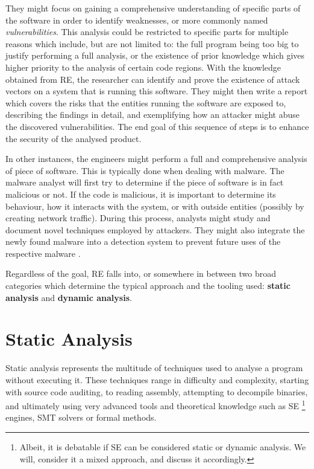 They might focus on gaining a comprehensive understanding of specific parts of the software in order to identify weaknesses, or more commonly named \emph{vulnerabilities}. This analysis could be restricted to specific parts for multiple reasons which include, but are not limited to: the full program being too big to justify performing a full analysis, or the existence of prior knowledge which gives higher priority to the analysis of certain code regions. With the knowledge obtained from \gls{RE}, the researcher can identify and prove the existence of attack vectors on a system that is running this software. They might then write a report which covers the risks that the entities running the software are exposed to, describing the findings in detail, and exemplifying how an attacker might abuse the discovered vulnerabilities. The end goal of this sequence of steps is to enhance the security of the analysed product.

In other instances, the engineers might perform a full and comprehensive analysis of piece of software. This is typically done when dealing with malware. The malware analyst will first try to determine if the piece of software is in fact malicious or not. If the code is malicious, it is important to determine its behaviour, how it interacts with the system, or with outside entities (possibly by creating network traffic). During this process, analysts might study and document novel techniques employed by attackers. They might also integrate the newly found malware into a detection system to prevent future uses of the respective malware \cite{malware_crowdstrike}.

Regardless of the goal, \gls{RE} falls into, or somewhere in between two broad categories which determine the typical approach and the tooling used: \textbf{static analysis} and \textbf{dynamic analysis}.

\section{Static Analysis}

Static analysis represents the multitude of techniques used to analyse a program without executing it. These techniques range in difficulty and complexity, starting with source code auditing, to reading assembly, attempting to decompile binaries, and ultimately using very advanced tools and theoretical knowledge such as \gls{SE} \footnote{Albeit, it is debatable if \gls{SE} can be considered static or dynamic analysis. We will, consider it a mixed approach, and discuss it accordingly.} engines, SMT solvers \cite{z3} or formal methods.

